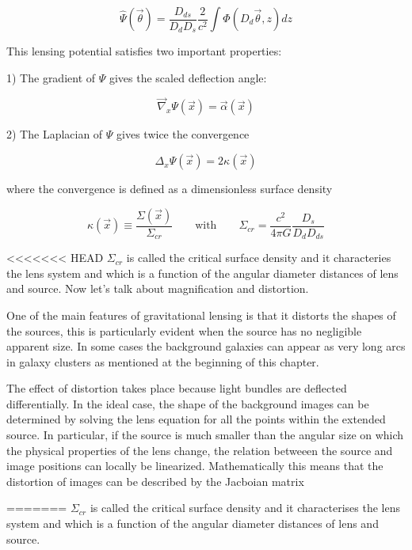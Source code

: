 \begin{equation}
\hat{\Psi}(\vec{\theta})=\frac{D_{ds}}{D_{d}D_{s}}\frac{2}{c^{2}}\int\Phi(D_{d}\vec{\theta},z)dz
\end{equation}

This lensing potential satisfies two important properties:

1) The gradient of $\Psi$ gives the scaled deflection angle:

\begin{equation}
\vec{\nabla}_{x}\Psi(\vec{x})=\vec{\alpha}(\vec{x})
\end{equation}

2) The Laplacian of $\Psi$ gives twice the convergence

\begin{equation}
\Delta_{x}\Psi(\vec{x})=2\kappa(\vec{x})
\end{equation}

where the convergence is defined as a dimensionless surface density

\begin{equation}
\kappa(\vec{x})\equiv \frac{\Sigma(\vec{x})}{\Sigma_{cr}}\qquad \text{with} \qquad \Sigma_{cr}=\frac{c^{2}}{4\pi G}\frac{D_s}{D_d D_{ds}}
\end{equation}

<<<<<<< HEAD
$\Sigma_{cr}$ is called the critical surface density and it characteries the lens system and which is a function of the angular diameter distances of lens and source. Now let's talk about magnification and distortion.

One of the main features of gravitational lensing is that it distorts the shapes of the sources, this is particularly evident when the source has no negligible apparent size. In some cases the background galaxies can appear as very long arcs in galaxy clusters as mentioned at the beginning of this chapter. 

The effect of distortion takes place because light bundles are deflected differentially. In the ideal case, the shape of the background images can be determined by solving the lens equation for all the points within the extended source. In particular, if the source is much smaller than the angular size on which the physical properties of the lens change, the relation betweeen the source and image positions can locally be linearized. Mathematically this means that the distortion of images can be described by the Jacboian matrix

=======
$\Sigma_{cr}$ is called the critical surface density and it characterises the lens system and which is a function of the angular diameter distances of lens and source. 

